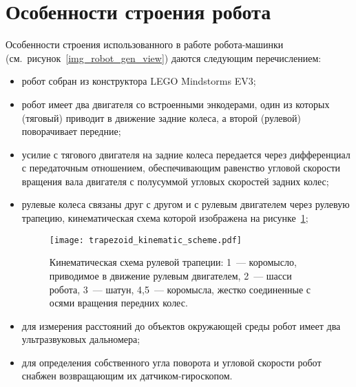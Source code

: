 \newpage
\section{Особенности строения робота}\label{part_robot_features}
Особенности строения использованного в работе робота-машинки (см.~рисунок~\ref{img_robot_gen_view}) даются следующим перечислением:
\begin{itemize}
    \item робот собран из конструктора LEGO Mindstorms EV3;
    \item робот имеет два двигателя со встроенными энкодерами, один из которых (тяговый) приводит в движение задние колеса, а второй (рулевой) поворачивает передние;
    \item усилие с тягового двигателя на задние колеса передается через дифференциал с передаточным отношением, обеспечивающим равенство угловой скорости вращения вала двигателя с полусуммой угловых скоростей задних колес;
    \item рулевые колеса связаны друг с другом и с рулевым двигателем через рулевую трапецию, кинематическая схема которой изображена на рисунке~\ref{img_trapezoid_scheme};
    \begin{figure}[h]
        \centering
        \texttt{[image: trapezoid\_kinematic\_scheme.pdf]}
        \caption{Кинематическая схема рулевой трапеции: 1~--- коромысло, приводимое в движение рулевым двигателем, 2~--- шасси робота, 3~--- шатун, 4,5~--- коромысла, жестко соединенные с осями вращения передних колес.}
        \label{img_trapezoid_scheme}
    \end{figure}
    \item для измерения расстояний до объектов окружающей среды робот имеет два ультразвуковых дальномера;
    \item для определения собственного угла поворота и угловой скорости робот снабжен возвращающим их датчиком-гироскопом.
\end{itemize}

